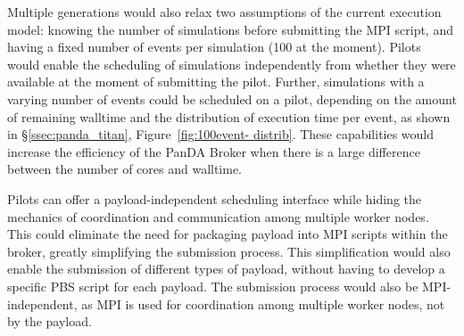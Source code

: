 
Multiple generations would also relax two assumptions of the current execution
model: knowing the number of simulations before submitting the MPI script, and
having a fixed number of events per simulation (100 at the moment). Pilots
would enable the scheduling of simulations independently from whether they
were available at the moment of submitting the pilot. Further, simulations
with a varying number of events could be scheduled on a pilot, depending on
the amount of remaining walltime and the distribution of execution time per
event, as shown in \S\ref{ssec:panda_titan}, Figure~\ref{fig:100event-
distrib}. These capabilities would increase the efficiency of the PanDA Broker
when there is a large difference between the number of cores and walltime.



Pilots can offer a payload-independent scheduling interface while hiding the
mechanics of coordination and communication among multiple worker nodes. This
could eliminate the need for packaging payload into MPI scripts within the
broker, greatly simplifying the submission process. This simplification would
also enable the submission of different types of payload, without having to
develop a specific PBS script for each payload. The submission process would
also be MPI-independent, as MPI is used for coordination among multiple worker
nodes, not by the payload. 

